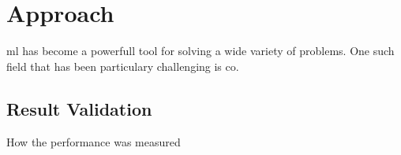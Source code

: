 \chapter{Approach}

\gls{ml} has become a powerfull tool for solving a wide variety of problems. One such field that has been particulary challenging is \gls{co}. 

\section{Result Validation}

How the performance was measured
